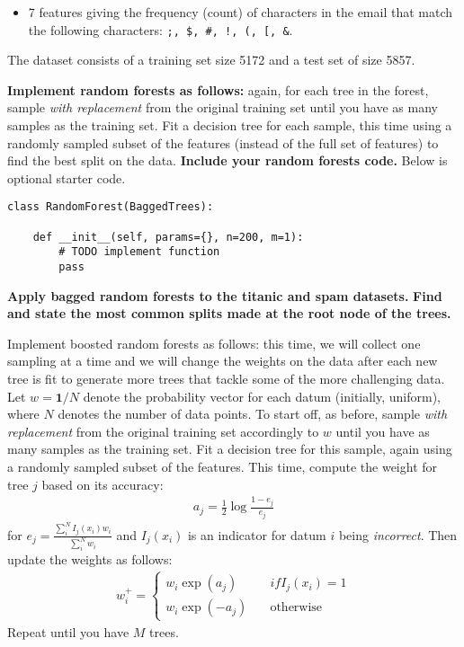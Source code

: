 \begin{Parts}
\begin{itemize}
\item 7 features giving the frequency (count) of characters in the email that match the following characters: \texttt{;, \$, \#, !, (, [, \&}.
\end{itemize}

The dataset consists of a training set size 5172 and a test set of size 5857.



\Part \textbf{Implement random forests as follows:} again, for each tree in the forest, sample \textit{with replacement} from the original training set until you have as many samples as the training set. Fit a decision tree for each sample, this time using a randomly sampled subset of the features (instead of the full set of features) to find the best split on the data. \textbf{Include your random forests code.} Below is optional starter code.

\begin{verbatim}
class RandomForest(BaggedTrees):

    def __init__(self, params={}, n=200, m=1):
        # TODO implement function
        pass
\end{verbatim}



\Part \textbf{Apply bagged random forests to the titanic and spam datasets.} \textbf{Find and state the most common splits made at the root node of the trees.}



\Part Implement boosted random forests as follows: this time, we will collect one sampling at a time and we will change the weights on the data after each new tree is fit to generate more trees that tackle some of the more challenging data. Let $w=\mathbf{1}/N$ denote the probability vector for each datum (initially, uniform), where $N$ denotes the number of data points. To start off, as before, sample \textit{with replacement} from the original training set accordingly to $w$ until you have as many samples as the training set. Fit a decision tree for this sample, again using a randomly sampled subset of the features. This time, compute the weight for tree $j$ based on its accuracy:
\begin{align*}
a_j = \frac{1}{2} \log \frac{1-e_j}{e_j}
\end{align*}
for $e_j = \frac{\sum_{i}^N I_j(x_i) w_i}{\sum_i^N w_i}$ and $I_j(x_i)$ is an indicator for datum $i$ being \textit{incorrect}.
Then update the weights as follows:
\begin{align*}
w_i^+ = \begin{cases} w_i \exp(a_j)  & \quad if I_j(x_i) = 1 \\
w_i \exp(-a_j) & \quad \text{otherwise}
\end{cases}
\end{align*}
Repeat until you have $M$ trees.


\end{Parts}
